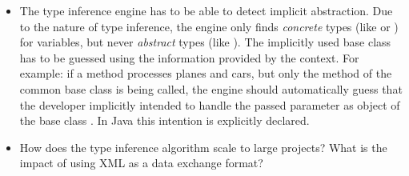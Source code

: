\documentclass[12pt,halfparskip]{scrartcl}
\begin{document}
\begin{itemize}
	\item The type inference engine has to be able to detect implicit abstraction. Due to the nature of type inference, the engine only finds \emph{concrete} types (like  or ) for variables, but never \emph {abstract} types (like ). The implicitly used base class has to be guessed using the information provided by the context. For example: if a method processes planes and cars, but only the method  of the common base class  is being called, the engine should automatically guess that the developer implicitly intended to handle the passed parameter as object of the base class . In Java this intention is explicitly declared.
	\item How does the type inference algorithm scale to large projects? What is the impact of using XML as a data exchange format?
\end{itemize}
\end{document}
